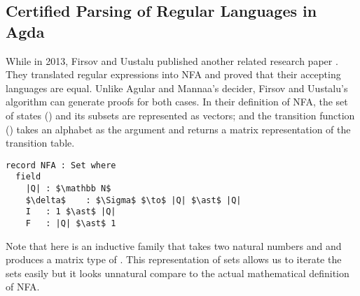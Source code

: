 \subsection{Certified Parsing of Regular Languages in Agda}
\par While in 2013, Firsov and Uustalu published another related
research paper \cite{firsov2013}. They translated regular expressions
into NFA and proved that their accepting languages are
equal. Unlike Agular and Mannaa's decider, Firsov and Uustalu's
algorithm can generate proofs for both cases. In their definition of NFA, the set of states
() and its subsets are represented as vectors; and the transition function
(\mb{\delta}) takes an alphabet as the argument and returns a matrix
representation of the transition table. 
\begin{lstlisting}[mathescape=true,xleftmargin=.3\textwidth]
record NFA : Set where
  field
    |Q| : $\mathbb N$
    $\delta$    : $\Sigma$ $\to$ |Q| $\ast$ |Q|
    I   : 1 $\ast$ |Q|
    F   : |Q| $\ast$ 1
\end{lstlisting}

\par Note that \mb{\_\ast\_} here is an inductive family that takes two
natural numbers  and  and produces a matrix type of . This representation of sets allows us to
iterate the sets easily but it looks unnatural compare to the actual 
mathematical definition of NFA. 
